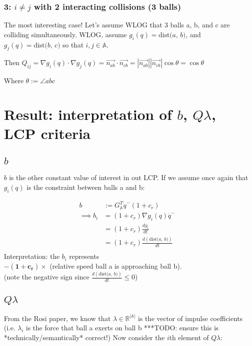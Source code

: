\documentclass[12pt]{article}
\newcommand{\GA}{G_{\mathbb{A}}}
\newcommand{\dist}[2]{\text{dist(} #1 \text{, } #2 \text{)}}
\begin{document}
\subsubsection*{3: $i \neq j$ with 2 interacting collisions (3 balls)}

The most interesting case! Let's assume WLOG that 3 balls a, b, and c are colliding simultaneously.
WLOG, assume $g_i(q) = \dist{a}{b}$, and $g_j(q) = \dist{b}{c}$ so that $i, j \in \mathbb{A}$.

Then
$Q_{ij}
    = \nabla g_i(q) \cdot \nabla g_j(q)
    = \vec{n_{ab}} \cdot \vec{n_{cb}}
    = |\vec{n_{ab}}||\vec{n_{cb}}|\cos{\theta}
    = \cos{\theta}
$

Where $\theta := \angle abc$

\section*{Result: interpretation of $b$, $Q \lambda$, LCP criteria}

\subsection*{$b$}

$b$ is the other constant value of interest in out LCP. If we assume once again that
$g_i(q)$ is the constraint between balls a and b:

\begin{align*}
    b   &:= \GA^T \dot{q}^-(1 + c_r)\\
    \implies b_i &= (1 + c_r) \nabla g_i(q) \dot{q}^-\\
    &= (1 + c_r) \frac{dg_i}{dt}\\
    &= (1 + c_r) \frac{d(\dist{a}{b})}{dt}\\
\end{align*}
Interpretation: the $b_i$ represents\\
\indent $\mathbf{-(1+c_r)} \times$ (relative speed ball a is approaching ball b).\\
(note the negative sign since $\frac{d(\dist{a}{b})}{dt} \leq 0$)

\subsection*{$Q \lambda$}

From the Rosi paper, we know that $\lambda \in \mathbb{R}^{|\mathbb{A}|}$ is the vector of
impulse coefficients (i.e. $\lambda_i$ is the force that ball a exerts on ball b
***TODO: ensure this is *technically/semantically* correct!)
Now consider the $i$th element of $Q\lambda$:
\end{document}
